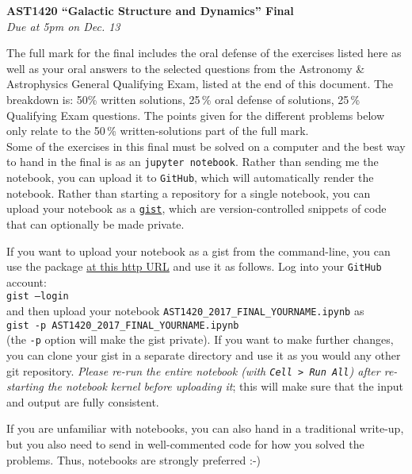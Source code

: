 \documentclass[12pt]{article}
\begin{document}
\begin{center}
{\bf \LARGE AST1420 ``Galactic Structure and Dynamics'' Final}\\[7pt]
\emph{Due at 5pm on Dec. 13}\\[7pt]
\end{center}

The full mark for the final includes the oral defense of the exercises
listed here as well as your oral answers to the selected questions
from the Astronomy \& Astrophysics General Qualifying Exam, listed at
the end of this document. The breakdown is: 50\% written solutions,
25\,\% oral defense of solutions, 25\,\% Qualifying Exam
questions. The points given for the different problems below only
relate to the 50\,\% written-solutions part of the full mark.\\

Some of the exercises in this final must be solved on a computer and
the best way to hand in the final is as an \texttt{jupyter
  notebook}. Rather than sending me the notebook, you can upload it to
\texttt{GitHub}, which will automatically render the notebook. Rather
than starting a repository for a single notebook, you can upload your
notebook as a \texttt{\href{https://gist.github.com/}{gist}}, which
are version-controlled snippets of code that can optionally be made
private.

If you want to upload your notebook as a gist from the command-line,
you can use the package \href{http://github.com/defunkt/gist}{at this
  http URL} and use it as follows. Log into your \texttt{GitHub}
account:\\

\texttt{gist --login}\\

and then upload your notebook
\texttt{AST1420\_2017\_FINAL\_YOURNAME.ipynb} as\\

\texttt{gist -p AST1420\_2017\_FINAL\_YOURNAME.ipynb}\\

(the \texttt{-p} option will make the gist private). If you want to
make further changes, you can clone your gist in a separate directory
and use it as you would any other git repository. \emph{Please re-run
  the entire notebook (with \texttt{Cell > Run All}) after re-starting
  the notebook kernel before uploading it}; this will make sure that
the input and output are fully consistent. 

If you are unfamiliar with notebooks, you can also hand in a
traditional write-up, but you also need to send in well-commented code
for how you solved the problems. Thus, notebooks are strongly
preferred :-)\\
\end{document}
